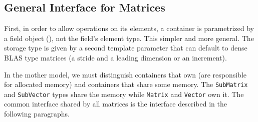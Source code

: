 \subsection{General Interface for %
Matrices}
%
First, in order to allow operations on its elements, a container is
parametrized by a field object (\cf {}), not the field's element type. This simpler and 
more general.  The storage type is given by a second template parameter
that can default to \eg dense BLAS type matrices (a stride and a leading
dimension or an increment).  %
%

%
In the mother model, we must distinguish containers that own (are responsible for allocated memory) and containers that share some
memory.  The \texttt{SubMatrix} and \texttt{SubVector} types share the memory
while \texttt{Matrix} and \texttt{Vector} own it.
%
The common interface shared by all matrices is the \applin  interface described
in the following paragraphs.
%
% 
%
